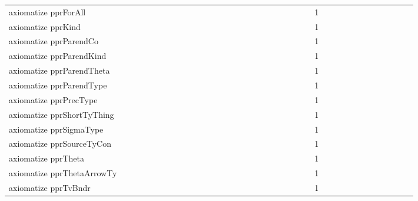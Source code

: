 {\begin{tabular}{l|rrr|rrr|rrr}
axiomatize pprForAll &  &  &  &  &  &  &  &  &  &  &  &  &  &  &  &  &  &  &  &  &  &  &  & 1 &  &  &  &  &  &  &  &  &  &  &  & \\
axiomatize pprKind &  &  &  &  &  &  &  &  &  &  &  &  &  &  &  &  &  &  &  &  &  &  &  & 1 &  &  &  &  &  &  &  &  &  &  &  & \\
axiomatize pprParendCo &  &  &  &  &  &  &  &  &  &  &  &  &  &  &  &  &  &  &  &  &  &  &  & 1 &  &  &  &  &  &  &  &  &  &  &  & \\
axiomatize pprParendKind &  &  &  &  &  &  &  &  &  &  &  &  &  &  &  &  &  &  &  &  &  &  &  & 1 &  &  &  &  &  &  &  &  &  &  &  & \\
axiomatize pprParendTheta &  &  &  &  &  &  &  &  &  &  &  &  &  &  &  &  &  &  &  &  &  &  &  & 1 &  &  &  &  &  &  &  &  &  &  &  & \\
axiomatize pprParendType &  &  &  &  &  &  &  &  &  &  &  &  &  &  &  &  &  &  &  &  &  &  &  & 1 &  &  &  &  &  &  &  &  &  &  &  & \\
axiomatize pprPrecType &  &  &  &  &  &  &  &  &  &  &  &  &  &  &  &  &  &  &  &  &  &  &  & 1 &  &  &  &  &  &  &  &  &  &  &  & \\
axiomatize pprShortTyThing &  &  &  &  &  &  &  &  &  &  &  &  &  &  &  &  &  &  &  &  &  &  &  & 1 &  &  &  &  &  &  &  &  &  &  &  & \\
axiomatize pprSigmaType &  &  &  &  &  &  &  &  &  &  &  &  &  &  &  &  &  &  &  &  &  &  &  & 1 &  &  &  &  &  &  &  &  &  &  &  & \\
axiomatize pprSourceTyCon &  &  &  &  &  &  &  &  &  &  &  &  &  &  &  &  &  &  &  &  &  &  &  & 1 &  &  &  &  &  &  &  &  &  &  &  & \\
axiomatize pprTheta &  &  &  &  &  &  &  &  &  &  &  &  &  &  &  &  &  &  &  &  &  &  &  & 1 &  &  &  &  &  &  &  &  &  &  &  & \\
axiomatize pprThetaArrowTy &  &  &  &  &  &  &  &  &  &  &  &  &  &  &  &  &  &  &  &  &  &  &  & 1 &  &  &  &  &  &  &  &  &  &  &  & \\
axiomatize pprTvBndr &  &  &  &  &  &  &  &  &  &  &  &  &  &  &  &  &  &  &  &  &  &  &  & 1 &  &  &  &  &  &  &  &  &  &  &  & \\

\end{tabular}}
